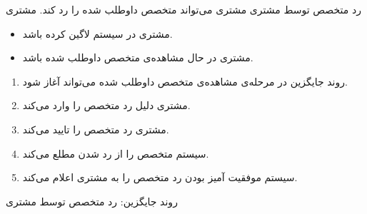 \alternativeflow
{
	رد متخصص توسط مشتری
}
{}
{
	مشتری می‌تواند متخصص داوطلب شده را رد کند.
}
{
	مشتری
}
{}
{
	\begin{itemize}
		\vspace*{-0.6cm}
		\item 
		مشتری در سیستم لاگین کرده باشد.
		\item
		مشتری در حال مشاهده‌ی متخصص داوطلب شده باشد.
	\end{itemize}
}
{
	\vspace*{-0.6cm}
	\begin{enumerate}
		\item 
		روند جایگزین در مرحله‌ی مشاهده‌ی متخصص داوطلب شده می‌تواند آغاز شود.
		\item
		مشتری دلیل رد متخصص را وارد می‌کند.
		\item
		مشتری رد متخصص را تایید می‌کند.
		\item
		سیستم متخصص را از رد شدن مطلع می‌کند.
		\item
		سیستم موفقیت آمیز بودن رد متخصص را به مشتری اعلام می‌کند.
	\end{enumerate}
}
{
}
{
روند جایگزین: رد متخصص توسط مشتری
}


